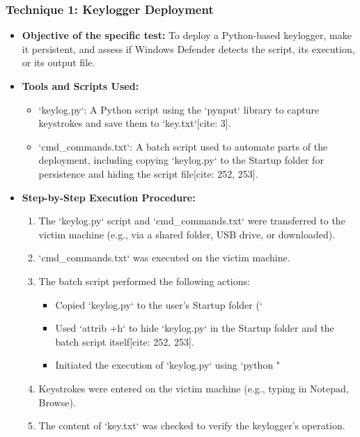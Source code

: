 \documentclass[11pt]{article}
\begin{document}
	\subsubsection{Technique 1: Keylogger Deployment}
	\begin{itemize}
		\item \textbf{Objective of the specific test:} To deploy a Python-based keylogger, make it persistent, and assess if Windows Defender detects the script, its execution, or its output file.
		\item \textbf{Tools and Scripts Used:}
		\begin{itemize}
			\item `keylog.py`: A Python script using the `pynput` library to capture keystrokes and save them to `key.txt`[cite: 3].
			\item `cmd\_commands.txt`: A batch script used to automate parts of the deployment, including copying `keylog.py` to the Startup folder for persistence and hiding the script file[cite: 252, 253].
		\end{itemize}
		\item \textbf{Step-by-Step Execution Procedure:}
		\begin{enumerate}
			\item The `keylog.py` script and `cmd\_commands.txt` were transferred to the victim machine (e.g., via a shared folder, USB drive, or downloaded).
			\item `cmd\_commands.txt` was executed on the victim machine.
			\item The batch script performed the following actions:
			\begin{itemize}
				\item Copied `keylog.py` to the user's Startup folder (`%
				\item Used `attrib +h` to hide `keylog.py` in the Startup folder and the batch script itself[cite: 252, 253].
				\item Initiated the execution of `keylog.py` using `python "%
			\end{itemize}
			\item Keystrokes were entered on the victim machine (e.g., typing in Notepad, Browse).
			\item The content of `key.txt` was checked to verify the keylogger's operation.
		\end{enumerate}

\end{itemize}
\end{document}
